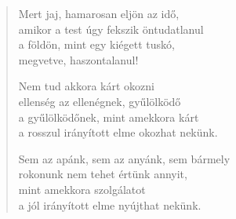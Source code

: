 \begin{verse}
 Mert jaj, hamarosan eljön az idő,\\
amikor a test úgy fekszik öntudatlanul\\
a földön, mint egy kiégett tuskó,\\
megvetve, haszontalanul!

 Nem tud akkora kárt okozni\\
ellenség az ellenégnek, gyűlölködő\\
a gyűlölködőnek, mint amekkora kárt\\
a rosszul irányított elme okozhat nekünk.

 Sem az apánk, sem az anyánk, sem bármely\\
rokonunk nem tehet értünk annyit,\\
mint amekkora szolgálatot\\
a jól irányított elme nyújthat nekünk.

\end{verse}
